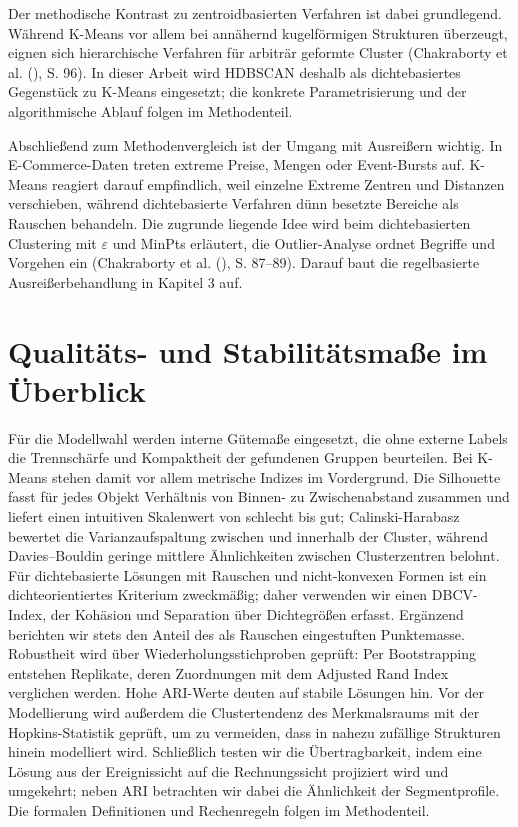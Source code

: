 \documentclass[
  11pt,
  openany, oneside]{book}
\begin{document}
Der methodische Kontrast zu zentroidbasierten Verfahren ist dabei
grundlegend. Während K-Means vor allem bei annähernd kugelförmigen
Strukturen überzeugt, eignen sich hierarchische Verfahren für arbiträr
geformte Cluster (Chakraborty et al.
(), S.
96). In dieser Arbeit wird HDBSCAN deshalb als dichtebasiertes
Gegenstück zu K-Means eingesetzt; die konkrete Parametrisierung und der
algorithmische Ablauf folgen im Methodenteil.

Abschließend zum Methodenvergleich ist der Umgang mit Ausreißern
wichtig. In E-Commerce-Daten treten extreme Preise, Mengen oder
Event-Bursts auf. K-Means reagiert darauf empfindlich, weil einzelne
Extreme Zentren und Distanzen verschieben, während dichtebasierte
Verfahren dünn besetzte Bereiche als Rauschen behandeln. Die zugrunde
liegende Idee wird beim dichtebasierten Clustering mit \(\varepsilon\)
und MinPts erläutert, die Outlier-Analyse ordnet Begriffe und Vorgehen
ein (Chakraborty et al.
(), S.
87--89). Darauf baut die regelbasierte Ausreißerbehandlung in Kapitel 3
auf.

\section{Qualitäts- und Stabilitätsmaße im
Überblick}\label{sec-qualitaet}

Für die Modellwahl werden interne Gütemaße eingesetzt, die ohne externe
Labels die Trennschärfe und Kompaktheit der gefundenen Gruppen
beurteilen. Bei K-Means stehen damit vor allem metrische Indizes im
Vordergrund. Die Silhouette fasst für jedes Objekt Verhältnis von
Binnen- zu Zwischenabstand zusammen und liefert einen intuitiven
Skalenwert von schlecht bis gut; Calinski-Harabasz bewertet die
Varianzaufspaltung zwischen und innerhalb der Cluster, während
Davies--Bouldin geringe mittlere Ähnlichkeiten zwischen Clusterzentren
belohnt. Für dichtebasierte Lösungen mit Rauschen und nicht-konvexen
Formen ist ein dichteorientiertes Kriterium zweckmäßig; daher verwenden
wir einen DBCV-Index, der Kohäsion und Separation über Dichtegrößen
erfasst. Ergänzend berichten wir stets den Anteil des als Rauschen
eingestuften Punktemasse. Robustheit wird über Wiederholungsstichproben
geprüft: Per Bootstrapping entstehen Replikate, deren Zuordnungen mit
dem Adjusted Rand Index verglichen werden. Hohe ARI-Werte deuten auf
stabile Lösungen hin. Vor der Modellierung wird außerdem die
Clustertendenz des Merkmalsraums mit der Hopkins-Statistik geprüft, um
zu vermeiden, dass in nahezu zufällige Strukturen hinein modelliert
wird. Schließlich testen wir die Übertragbarkeit, indem eine Lösung aus
der Ereignissicht auf die Rechnungssicht projiziert wird und umgekehrt;
neben ARI betrachten wir dabei die Ähnlichkeit der Segmentprofile. Die
formalen Definitionen und Rechenregeln folgen im Methodenteil.
\end{document}
